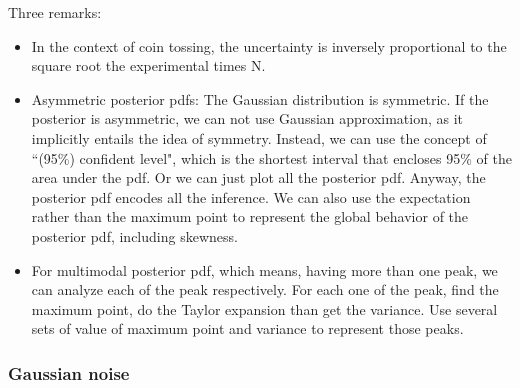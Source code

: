 \documentclass[11pt, a4paper]{article}
\begin{document}
Three remarks:
\begin{itemize}
\item In the context of coin tossing, the uncertainty is inversely proportional to the square root the experimental times N.
\item Asymmetric posterior pdfs: The Gaussian distribution is symmetric. If the posterior is asymmetric, we can not use Gaussian approximation, as it implicitly entails the idea of symmetry. Instead, we can use the concept of ``(95\%) confident level", which is the shortest interval that encloses 95\% of the area under the pdf. Or we can just plot all the posterior pdf. Anyway, the posterior pdf encodes all the inference. We can also use the expectation rather than the maximum point to represent the global behavior of the posterior pdf, including skewness.
\item For multimodal posterior pdf, which means, having more than one peak, we can analyze each of the peak respectively. For each one of the peak, find the maximum point, do the Taylor expansion than get the variance. Use several sets of value of maximum point and variance to represent those peaks.
\end{itemize}

\subsubsection{Gaussian noise}
\quad
\end{document}
